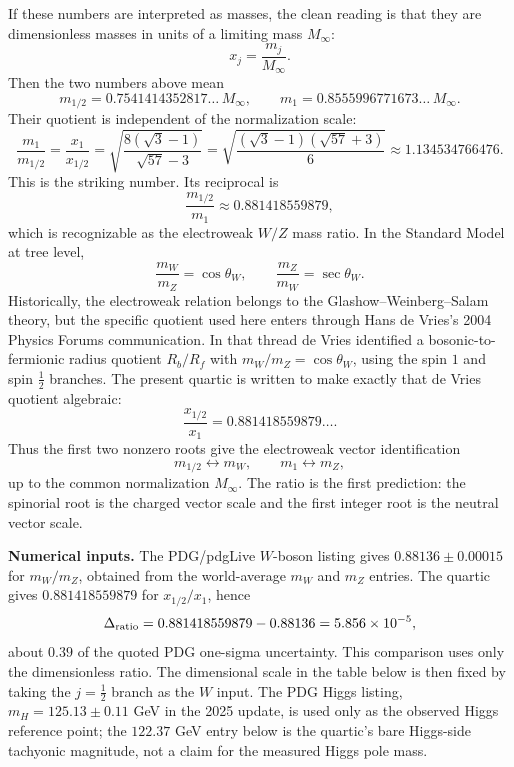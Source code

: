 \documentclass[11pt]{article}
\begin{document}
If these numbers are interpreted as masses, the clean reading is that they are dimensionless masses in units of a limiting mass \(M_\infty\):
\[
        x_j=\frac{m_j}{M_\infty}.
\]
Then the two numbers above mean
\[
        m_{1/2}=0.7541414352817\ldots\,M_\infty,
        \qquad
        m_1=0.8555996771673\ldots\,M_\infty .
\]
Their quotient is independent of the normalization scale:
\[
        \frac{m_1}{m_{1/2}}
        =
        \frac{x_1}{x_{1/2}}
        =
        \sqrt{\frac{8(\sqrt{3}-1)}{\sqrt{57}-3}}
        =
        \sqrt{\frac{(\sqrt{3}-1)(\sqrt{57}+3)}{6}}
        \approx 1.134534766476 .
\]
This is the striking number. Its reciprocal is
\[
        \frac{m_{1/2}}{m_1}
        \approx 0.881418559879 ,
\]
which is recognizable as the electroweak \(W/Z\) mass ratio. In the Standard Model at tree level,
\[
        \frac{m_W}{m_Z}=\cos\theta_W,
        \qquad
        \frac{m_Z}{m_W}=\sec\theta_W .
\]
Historically, the electroweak relation belongs to the Glashow--Weinberg--Salam theory, but the specific quotient used here enters through Hans de Vries's 2004 Physics Forums communication. In that thread de Vries identified a bosonic-to-fermionic radius quotient \(R_b/R_f\) with \(m_W/m_Z=\cos\theta_W\), using the spin \(1\) and spin \(\frac12\) branches. The present quartic is written to make exactly that de Vries quotient algebraic:
\[
        \frac{x_{1/2}}{x_1}=0.881418559879\ldots .
\]
Thus the first two nonzero roots give the electroweak vector identification
\[
        m_{1/2}\leftrightarrow m_W,
        \qquad
        m_1\leftrightarrow m_Z,
\]
up to the common normalization \(M_\infty\). The ratio is the first prediction: the spinorial root is the charged vector scale and the first integer root is the neutral vector scale.

\textbf{Numerical inputs.}
The PDG/pdgLive \(W\)-boson listing gives \(0.88136\pm0.00015\) for \(m_W/m_Z\), obtained from the world-average \(m_W\) and \(m_Z\) entries. The quartic gives \(0.881418559879\) for \(x_{1/2}/x_1\), hence
\[
        \Delta_{\rm ratio}=0.881418559879-0.88136
        =5.856\times10^{-5},
\]
about \(0.39\) of the quoted PDG one-sigma uncertainty. This comparison uses only the dimensionless ratio. The dimensional scale in the table below is then fixed by taking the \(j=\frac12\) branch as the \(W\) input. The PDG Higgs listing, \(m_H=125.13\pm0.11\) GeV in the 2025 update, is used only as the observed Higgs reference point; the \(122.37\) GeV entry below is the quartic's bare Higgs-side tachyonic magnitude, not a claim for the measured Higgs pole mass.
\end{document}
